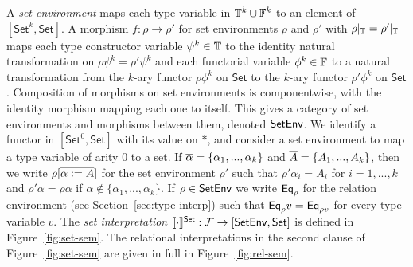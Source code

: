 \documentclass[runningheads]{llncs}
\newcommand{\set}{\mathsf{Set}}
\newcommand{\F}{\mathcal{F}}
\begin{document}
A {\em set environment} maps each type variable in $\mathbb{T}^k \cup
\mathbb{F}^k$ to an element of $[\set^k,\set]$.  A morphism $f : \rho \to
\rho'$ for set environments $\rho$ and $\rho'$ with $\rho|_{\mathbb{T}} =
\rho'|_{\mathbb{T}}$ maps each type constructor variable $\psi^k \in \mathbb{T}$
to the identity natural transformation on $\rho \psi^k = \rho'\psi^k$
and each functorial variable $\phi^k \in \mathbb{F}$ to a natural
transformation from the $k$-ary functor $\rho \phi^k$ on $\set$ to the
$k$-ary functor $\rho' \phi^k$ on $\set$.  Composition of morphisms on
set environments is componentwise, with the identity morphism mapping
each one to itself. This gives a category of set environments and
morphisms between them, denoted $\mathsf{SetEnv}$.  We identify a functor in
$[\set^0, \set]$ with its value on $\ast$, and consider a set
environment to map a type variable of arity $0$ to a set.  If
$\overline{\alpha} = \{\alpha_1,...,\alpha_k\}$ and $\overline{A} =
\{A_1,...,A_k\}$, then we write $\rho[\overline{\alpha := A}]$ for the set
environment $\rho'$ such that $\rho' \alpha_i = A_i$ for $i = 1,...,k$
and $\rho' \alpha = \rho \alpha$ if $\alpha \not \in
\{\alpha_1,...,\alpha_k\}$.  If $\rho \in \mathsf{SetEnv}$ we write $\mathsf{Eq}_\rho$
for the relation environment (see Section~\ref{sec:type-interp}) such
that $\mathsf{Eq}_\rho v = \mathsf{Eq}_{\rho v}$ for every type variable $v$.  The
{\em set interpretation} $\setsem{\cdot} : \F \to [\setenv, \set]$ is
defined in Figure~\ref{fig:set-sem}.  The relational interpretations
in the second clause of Figure~\ref{fig:set-sem} are given in full
in Figure~\ref{fig:rel-sem}.
\end{document}
